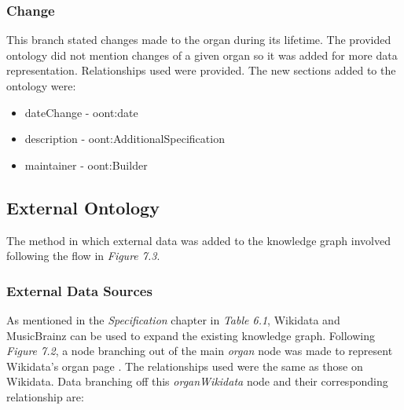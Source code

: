 \subsubsection{Change}
\hspace*{0.5cm} This branch stated changes made to the organ during its lifetime. The provided ontology did not mention changes of a given organ so it was added for more data representation. Relationships used were provided. The new sections added to the ontology were:

\vspace{-0.15cm}
\begin{itemize}
    \itemsep0em 
    \item dateChange - oont:date 
    \vspace{-0.05cm}
    \item description - oont:AdditionalSpecification
    \vspace{-0.05cm}
    \item maintainer - oont:Builder
\end{itemize}
\vspace{-0.25cm}

\subsection{External Ontology}
\hspace*{0.5cm} The method in which external data was added to the knowledge graph involved following the flow in \textit{Figure 7.3}. 

\subsubsection{External Data Sources}
\hspace*{0.5cm} As mentioned in the \textit{Specification} chapter in \textit{Table 6.1}, Wikidata and MusicBrainz can be used to expand the existing knowledge graph. Following \textit{Figure 7.2}, a node branching out of the main \textit{organ} node was made to represent Wikidata's organ page \cite{organwikidata}. The relationships used were the same as those on Wikidata. Data branching off this \textit{organWikidata} node and their corresponding relationship are:


